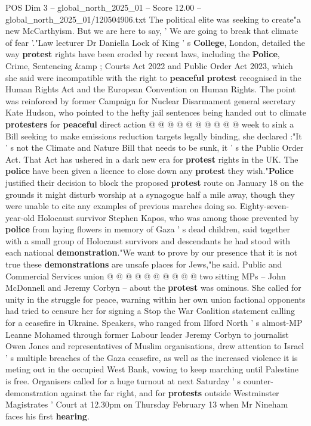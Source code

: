 \begin{textsample}{POS Dim 3 – global\_north\_2025\_01 – Score 12.00 – global\_north\_2025\_01/120504906.txt}
The political elite was seeking to create"a new McCarthyism.
But we are here to say, ' We are going to break that climate of fear '."Law lecturer Dr Daniella Lock of King ' s \textbf{College}, London, detailed the way \textbf{protest} rights have been eroded by recent laws, including the \textbf{Police}, Crime, Sentencing \&amp ; Courts Act 2022 and Public Order Act 2023, which she said were incompatible with the right to \textbf{peaceful} \textbf{protest} recognised in the Human Rights Act and the European Convention on Human Rights.
The point was reinforced by former Campaign for Nuclear Disarmament general secretary Kate Hudson, who pointed to the hefty jail sentences being handed out to climate \textbf{protesters} for \textbf{peaceful} direct action @ @ @ @ @ @ @ @ @ @ week to sink a Bill seeking to make emissions reduction targets legally binding, she declared :"It ' s not the Climate and Nature Bill that needs to be sunk, it ' s the Public Order Act.
That Act has ushered in a dark new era for \textbf{protest} rights in the UK.
The \textbf{police} have been given a licence to close down any \textbf{protest} they wish."\textbf{Police} justified their decision to block the proposed \textbf{protest} route on January 18 on the grounds it might disturb worship at a synagogue half a mile away, though they were unable to cite any examples of previous marches doing so.
Eighty-seven-year-old Holocaust survivor Stephen Kapos, who was among those prevented by \textbf{police} from laying flowers in memory of Gaza ' s dead children, said together with a small group of Holocaust survivors and descendants he had stood with each national \textbf{demonstration}."We want to prove by our presence that it is not true these \textbf{demonstrations} are unsafe places for Jews,"he said.
Public and Commercial Services union @ @ @ @ @ @ @ @ @ @ two sitting MPs -- John McDonnell and Jeremy Corbyn -- about the \textbf{protest} was ominous.
She called for unity in the struggle for peace, warning within her own union factional opponents had tried to censure her for signing a Stop the War Coalition statement calling for a ceasefire in Ukraine.
Speakers, who ranged from Ilford North ' s almost-MP Leanne Mohamed through former Labour leader Jeremy Corbyn to journalist Owen Jones and representatives of Muslim organisations, drew attention to Israel ' s multiple breaches of the Gaza ceasefire, as well as the increased violence it is meting out in the occupied West Bank, vowing to keep marching until Palestine is free.
Organisers called for a huge turnout at next Saturday ' s counter-demonstration against the far right, and for \textbf{protests} outside Westminster Magistrates ' Court at 12.30pm on Thursday February 13 when Mr Nineham faces his first \textbf{hearing}.

\end{textsample}
